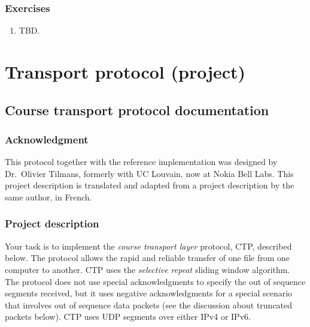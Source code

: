 \documentclass[12pt]{book}
\begin{document}
\begin{enumerate}[label=\arabic*.]
\begin{enumerate}[label=Activity \arabic*)]
\end{enumerate}


\section{Exercises}\label{pl7.ex}

\begin{enumerate}[label=\arabic*.]
\item TBD.
\end{enumerate}


\part{Transport protocol (project)}\label{protocol.part}

\newcommand{\must}{\textbf{MUST}}
\newcommand{\should}{\textbf{SHOULD}}

\newcommand{\pdata}{\texttt{PTYPE\_DATA}}
\newcommand{\pack}{\texttt{PTYPE\_ACK}}
\newcommand{\pnack}{\texttt{PTYPE\_NACK}}

\newcommand{\sender}{\texttt{sender}}
\newcommand{\receiver}{\texttt{receiver}}


\chapter{Course transport protocol documentation}\label{proto-doc.se}

\section{Acknowledgment}

This protocol together with the reference implementation was designed by Dr.~Olivier Tilmans, formerly with UC Louvain, now at Nokia Bell Labs. This project description is translated and adapted from a project description by the same author, in French.

\section{Project description}

Your task is to implement the \emph{course transport layer} protocol, CTP, described below. The protocol allows the rapid and reliable transfer of one file from one computer to another. CTP uses the \emph{selective repeat} sliding window algorithm. The protocol does not use special acknowledgments to specify the out of sequence segments received, but it uses negative acknowledgments for a special scenario that involves out of sequence data packets (see the discussion about truncated packets below). CTP uses UDP segments over either IPv4 or IPv6.


\end{enumerate}
\end{document}
